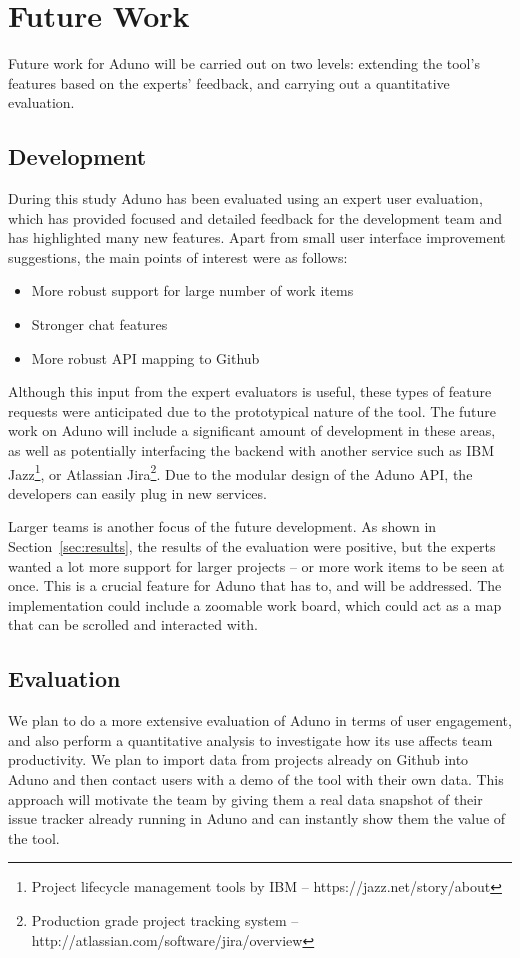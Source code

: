 \documentclass[conference]{IEEEtran}
\begin{document}
\section{Future Work}
\label{sec:future}

Future work for Aduno will be carried out on two levels: extending the tool's features based on the experts' feedback, and carrying out a quantitative evaluation. 
\subsection{Development}
During this study Aduno has been evaluated using an expert user evaluation, which has provided focused and detailed feedback for the development team and has highlighted many new features.  Apart from small user interface improvement suggestions, the main points of interest were as follows:

\begin{itemize}
    \item{More robust support for large number of work items}
    \item{Stronger chat features} 
    \item{More robust API mapping to Github}
\end{itemize}

Although this input from the expert evaluators is  useful, these types of feature requests were anticipated due to the prototypical nature of the tool.  The future work on Aduno will include a significant amount of development in these areas, as well as potentially interfacing the backend with another service such as IBM Jazz\footnote{Project lifecycle management tools by IBM -- https://jazz.net/story/about}, or Atlassian Jira\footnote{Production grade project tracking system -- http://atlassian.com/software/jira/overview}. Due to the modular design of the Aduno API, the developers can easily plug in new services.  

Larger teams is another focus of the future development.  As shown in Section~\ref{sec:results}, the results of the evaluation were positive, but the experts wanted a lot more support for larger projects -- or more work items to be seen at once.  This is a crucial feature for Aduno that has to, and will be addressed.  The implementation could include a zoomable work board, which could act as a map that can be scrolled and interacted with.  

\subsection{Evaluation}
We plan to do a more extensive evaluation of Aduno in terms of user engagement, and also perform a quantitative analysis to investigate how its use affects team productivity. We plan to import data from projects already on Github into Aduno and then contact users with a demo of the tool with their own data. This approach will motivate the team by giving them a real data snapshot of their issue tracker already running in Aduno and can instantly show them the value of the tool.  
\end{document}
